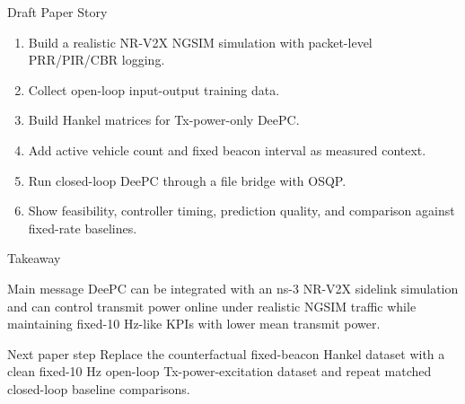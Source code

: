 \documentclass[aspectratio=1610,10pt]{beamer}
\begin{document}
\begin{frame}{Draft Paper Story}
  \begin{enumerate}
    \item Build a realistic NR-V2X NGSIM simulation with packet-level PRR/PIR/CBR logging.
    \item Collect open-loop input-output training data.
    \item Build Hankel matrices for Tx-power-only DeePC.
    \item Add active vehicle count and fixed beacon interval as measured context.
    \item Run closed-loop DeePC through a file bridge with OSQP.
    \item Show feasibility, controller timing, prediction quality, and comparison against fixed-rate baselines.
  \end{enumerate}
\end{frame}

\begin{frame}{Takeaway}
  \begin{block}{Main message}
    DeePC can be integrated with an ns-3 NR-V2X sidelink simulation and can control transmit power online under realistic NGSIM traffic while maintaining fixed-10 Hz-like KPIs with lower mean transmit power.
  \end{block}

  \vspace{0.8em}
  \begin{block}{Next paper step}
    Replace the counterfactual fixed-beacon Hankel dataset with a clean fixed-10 Hz open-loop Tx-power-excitation dataset and repeat matched closed-loop baseline comparisons.
  \end{block}
\end{frame}
\end{document}
